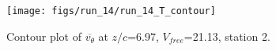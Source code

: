 \begin{figure}[H]
\centering
\texttt{[image: figs/run\_14/run\_14\_T\_contour]}
\caption{Contour plot of $\overline{v_{\theta}}$ at $z/c$=6.97, $V_{free}$=21.13, station 2.}
\label{fig:run_14_T_contour}
\end{figure}


